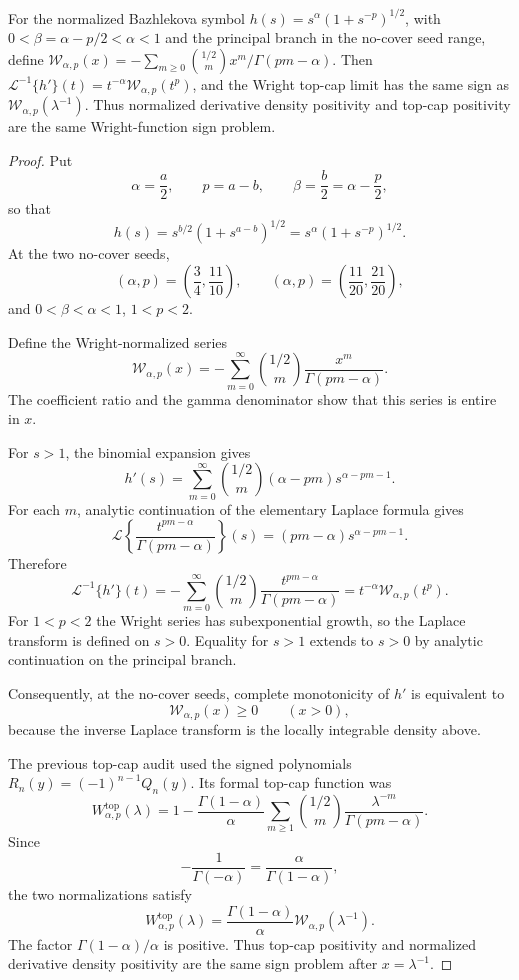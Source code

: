 \begin{proposition}
\label{res:bazhlekova-wright-density-topcap-bridge-normal-form}
For the normalized Bazhlekova symbol \(h(s)=s^\alpha(1+s^{-p})^{1/2}\), with \(0<\beta=\alpha-p/2<\alpha<1\) and the principal branch in the no-cover seed range, define \(\mathcal W_{\alpha,p}(x)=-\sum_{m\ge0}\binom{1/2}{m}x^m/\Gamma(pm-\alpha)\). Then \(\mathcal L^{-1}\{h'\}(t)=t^{-\alpha}\mathcal W_{\alpha,p}(t^p)\), and the Wright top-cap limit has the same sign as \(\mathcal W_{\alpha,p}(\lambda^{-1})\). Thus normalized derivative density positivity and top-cap positivity are the same Wright-function sign problem.
\end{proposition}
\begin{proof}
Put
\[
\alpha=\frac a2,\qquad p=a-b,\qquad \beta=\frac b2=\alpha-\frac p2,
\]
so that
\[
h(s)=s^{b/2}(1+s^{a-b})^{1/2}
=s^\alpha(1+s^{-p})^{1/2}.
\]
At the two no-cover seeds,
\[
(\alpha,p)=\left(\frac34,\frac{11}{10}\right),
\qquad
(\alpha,p)=\left(\frac{11}{20},\frac{21}{20}\right),
\]
and \(0<\beta<\alpha<1\), \(1<p<2\).

Define the Wright-normalized series
\[
\mathcal W_{\alpha,p}(x)
=
-\sum_{m=0}^{\infty}
\binom{1/2}{m}\frac{x^m}{\Gamma(pm-\alpha)}.
\]
The coefficient ratio and the gamma denominator show that this series is entire in \(x\).

For \(s>1\), the binomial expansion gives
\[
h'(s)
=
\sum_{m=0}^{\infty}
\binom{1/2}{m}(\alpha-pm)s^{\alpha-pm-1}.
\]
For each \(m\), analytic continuation of the elementary Laplace formula gives
\[
\mathcal L\left\{
\frac{t^{pm-\alpha}}{\Gamma(pm-\alpha)}
\right\}(s)
=(pm-\alpha)s^{\alpha-pm-1}.
\]
Therefore
\[
\mathcal L^{-1}\{h'\}(t)
=
-\sum_{m=0}^{\infty}
\binom{1/2}{m}
\frac{t^{pm-\alpha}}{\Gamma(pm-\alpha)}
=
t^{-\alpha}\mathcal W_{\alpha,p}(t^p).
\]
For \(1<p<2\) the Wright series has subexponential growth, so the Laplace transform is defined on \(s>0\). Equality for \(s>1\) extends to \(s>0\) by analytic continuation on the principal branch.

Consequently, at the no-cover seeds, complete monotonicity of \(h'\) is equivalent to
\[
\mathcal W_{\alpha,p}(x)\ge0
\qquad(x>0),
\]
because the inverse Laplace transform is the locally integrable density above.

The previous top-cap audit used the signed polynomials \(R_n(y)=(-1)^{n-1}Q_n(y)\). Its formal top-cap function was
\[
W^{\mathrm{top}}_{\alpha,p}(\lambda)
=
1-\frac{\Gamma(1-\alpha)}{\alpha}
\sum_{m\ge1}\binom{1/2}{m}
\frac{\lambda^{-m}}{\Gamma(pm-\alpha)}.
\]
Since
\[
-\frac1{\Gamma(-\alpha)}
=\frac{\alpha}{\Gamma(1-\alpha)},
\]
the two normalizations satisfy
\[
W^{\mathrm{top}}_{\alpha,p}(\lambda)
=
\frac{\Gamma(1-\alpha)}{\alpha}
\mathcal W_{\alpha,p}(\lambda^{-1}).
\]
The factor \(\Gamma(1-\alpha)/\alpha\) is positive. Thus top-cap positivity and normalized derivative density positivity are the same sign problem after \(x=\lambda^{-1}\).
\end{proof}

